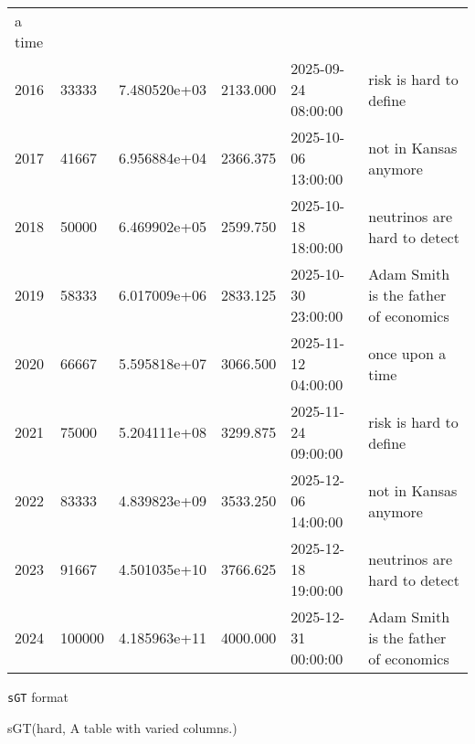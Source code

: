 \documentclass[
  12pt,
  a4paper,
  DIV=11,
  numbers=noendperiod]{scrartcl}
\newenvironment{Shaded}{\begin{snugshade}}{\end{snugshade}}
\newcommand{\NormalTok}[1]{\textcolor[rgb]{0.00,0.23,0.31}{#1}}
\newcommand{\StringTok}[1]{\textcolor[rgb]{0.13,0.47,0.30}{#1}}
\begin{document}
\begin{longtable}[]{@{}llllll@{}}
a time \\
2016 & 33333 & 7.480520e+03 & 2133.000 & 2025-09-24 08:00:00 & risk is
hard to define \\
2017 & 41667 & 6.956884e+04 & 2366.375 & 2025-10-06 13:00:00 & not in
Kansas anymore \\
2018 & 50000 & 6.469902e+05 & 2599.750 & 2025-10-18 18:00:00 & neutrinos
are hard to detect \\
2019 & 58333 & 6.017009e+06 & 2833.125 & 2025-10-30 23:00:00 & Adam
Smith is the father of economics \\
2020 & 66667 & 5.595818e+07 & 3066.500 & 2025-11-12 04:00:00 & once upon
a time \\
2021 & 75000 & 5.204111e+08 & 3299.875 & 2025-11-24 09:00:00 & risk is
hard to define \\
2022 & 83333 & 4.839823e+09 & 3533.250 & 2025-12-06 14:00:00 & not in
Kansas anymore \\
2023 & 91667 & 4.501035e+10 & 3766.625 & 2025-12-18 19:00:00 & neutrinos
are hard to detect \\
2024 & 100000 & 4.185963e+11 & 4000.000 & 2025-12-31 00:00:00 & Adam
Smith is the father of economics \\

\end{longtable}

\texttt{sGT} format

\begin{Shaded}
\begin{Highlighting}[]
\NormalTok{sGT(hard, }\StringTok{\textquotesingle{}A table with varied columns.\textquotesingle{}}\NormalTok{)}
\end{Highlighting}
\end{Shaded}
\end{document}
